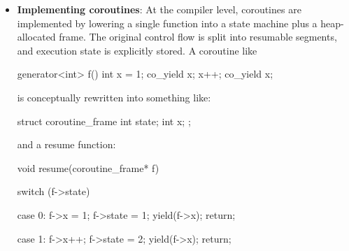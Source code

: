 \documentclass{report}
\begin{document}
\begin{itemize}
\begin{cppcode}
                \end{cppcode}
                \bigbreak \noindent 
                That is why coroutines are useful for generators, async I/O, and state machines.
                \bigbreak \noindent 
                \textbf{Note:} A coroutine is not necessarily a thread. A thread is scheduled by the OS and can run independently. A coroutine usually runs on the same thread and only switches when it explicitly suspends.
            \item \textbf{Implementing coroutines}: At the compiler level, coroutines are implemented by lowering a single function into a state machine plus a heap-allocated frame. The original control flow is split into resumable segments, and execution state is explicitly stored.
                \bigbreak \noindent 
                A coroutine like
                \bigbreak \noindent 
                \begin{cppcode}
                    generator<int> f() {
                        int x = 1;
                        co_yield x;
                        x++;
                        co_yield x;
                    }
                \end{cppcode}
                \bigbreak \noindent 
                is conceptually rewritten into something like:
                \bigbreak \noindent 
                \begin{cppcode}
                    struct coroutine_frame {
                        int state;
                        int x;
                    };
                \end{cppcode}
                \bigbreak \noindent 
                and a resume function:
                \bigbreak \noindent 
                \begin{cppcode}
                    void resume(coroutine_frame* f) {
                        switch (f->state) {
                            case 0:
                            f->x = 1;
                            f->state = 1;
                            yield(f->x);
                            return;

                            case 1:
                            f->x++;
                            f->state = 2;
                            yield(f->x);
                            return;

}}
\end{cppcode}
\end{itemize}
\end{document}
